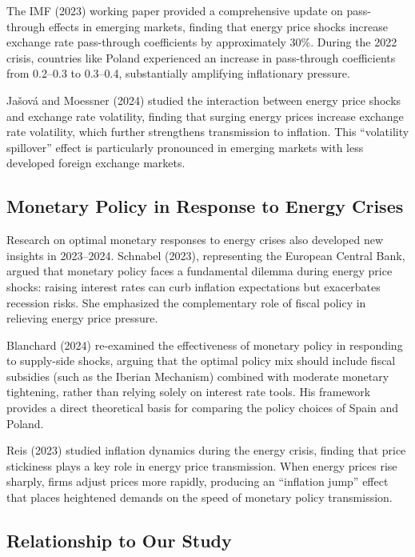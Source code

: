 \documentclass[12pt, a4paper]{article}
\begin{document}
The IMF (2023) working paper provided a comprehensive update on pass-through effects in emerging markets, finding that energy price shocks increase exchange rate pass-through coefficients by approximately 30\%. During the 2022 crisis, countries like Poland experienced an increase in pass-through coefficients from 0.2--0.3 to 0.3--0.4, substantially amplifying inflationary pressure.

Ja\v{s}ov\'{a} and Moessner (2024) studied the interaction between energy price shocks and exchange rate volatility, finding that surging energy prices increase exchange rate volatility, which further strengthens transmission to inflation. This ``volatility spillover'' effect is particularly pronounced in emerging markets with less developed foreign exchange markets.


\subsection{Monetary Policy in Response to Energy Crises}

Research on optimal monetary responses to energy crises also developed new insights in 2023--2024. Schnabel (2023), representing the European Central Bank, argued that monetary policy faces a fundamental dilemma during energy price shocks: raising interest rates can curb inflation expectations but exacerbates recession risks. She emphasized the complementary role of fiscal policy in relieving energy price pressure.

Blanchard (2024) re-examined the effectiveness of monetary policy in responding to supply-side shocks, arguing that the optimal policy mix should include fiscal subsidies (such as the Iberian Mechanism) combined with moderate monetary tightening, rather than relying solely on interest rate tools. His framework provides a direct theoretical basis for comparing the policy choices of Spain and Poland.

Reis (2023) studied inflation dynamics during the energy crisis, finding that price stickiness plays a key role in energy price transmission. When energy prices rise sharply, firms adjust prices more rapidly, producing an ``inflation jump'' effect that places heightened demands on the speed of monetary policy transmission.


\subsection{Relationship to Our Study}
\end{document}
